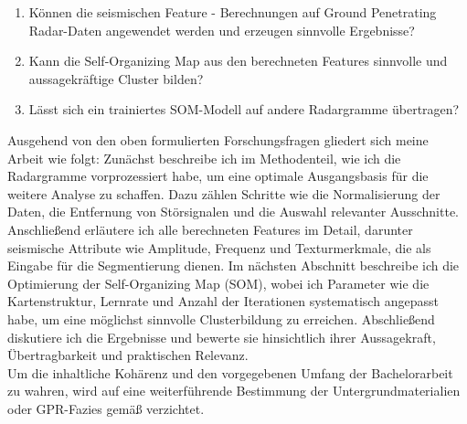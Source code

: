 \begin{enumerate}
    \item Können die seismischen Feature - Berechnungen auf Ground Penetrating Radar-Daten angewendet werden und erzeugen sinnvolle Ergebnisse?
    \item Kann die Self-Organizing Map aus den berechneten Features sinnvolle und aussagekräftige Cluster bilden?
    \item Lässt sich ein trainiertes SOM-Modell auf andere Radargramme übertragen?
\end{enumerate}
Ausgehend von den oben formulierten Forschungsfragen gliedert sich meine Arbeit wie folgt: Zunächst beschreibe ich im Methodenteil, wie ich die Radargramme vorprozessiert habe, um eine optimale Ausgangsbasis für die weitere Analyse zu schaffen. Dazu zählen Schritte wie die Normalisierung der Daten, die Entfernung von Störsignalen und die Auswahl relevanter Ausschnitte. Anschließend erläutere ich alle berechneten Features im Detail, darunter seismische Attribute wie Amplitude, Frequenz und Texturmerkmale, die als Eingabe für die Segmentierung dienen. Im nächsten Abschnitt beschreibe ich die Optimierung der Self-Organizing Map (SOM), wobei ich Parameter wie die Kartenstruktur, Lernrate und Anzahl der Iterationen systematisch angepasst habe, um eine möglichst sinnvolle Clusterbildung zu erreichen. Abschließend diskutiere ich die Ergebnisse und bewerte sie hinsichtlich ihrer Aussagekraft, Übertragbarkeit und praktischen Relevanz. \\
Um die inhaltliche Kohärenz und den vorgegebenen Umfang der Bachelorarbeit zu wahren, wird auf eine weiterführende Bestimmung der Untergrundmaterialien oder GPR-Fazies gemäß \textcite{corradini_day_2023} verzichtet.